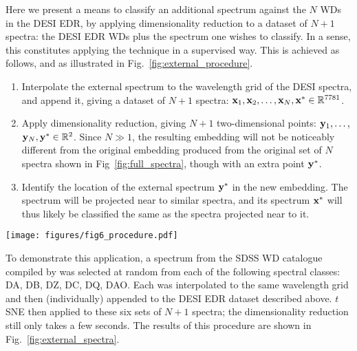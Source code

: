 \documentclass[fleqn,usenatbib]{mnras}
\def\xb{\vb{x}}
\def\yb{\vb{y}}
\begin{document}
Here we present a means to classify an additional spectrum against the $N$ WDs in the DESI EDR, by applying dimensionality reduction to a dataset of $N+1$ spectra: the DESI EDR WDs plus the spectrum one wishes to classify.
In a sense, this constitutes applying the technique in a supervised way.
This is achieved as follows, and as illustrated in Fig.~\ref{fig:external_procedure}.
\begin{enumerate}
\item
Interpolate the external spectrum to the wavelength grid of the DESI spectra, and append it, giving a dataset of $N+1$ spectra: $\xb_1, \xb_2, \dots, \xb_N, \xb^* \in \mathbb{R}^{7781}$.
\item
Apply dimensionality reduction, giving $N+1$ two-dimensional points: $\yb_1, \dots,$ $\yb_N, \yb^* \in \mathbb{R}^2$.
Since $N\gg1$, the resulting embedding will not be noticeably different from the original embedding produced from the original set of $N$ spectra shown in Fig~\ref{fig:full_spectra}, though with an extra point $\yb^*$.
\item
Identify the location of the external spectrum $\yb^*$ in the new embedding.
The spectrum will be projected near to similar spectra, and its spectrum $\xb^*$ will thus likely be classified the same as the spectra projected near to it.
\end{enumerate}

\begin{figure*}
\texttt{[image: figures/fig6\_procedure.pdf]}
\caption{
    Procedure for classifying external WD spectra against DESI EDR (see text).
    One would estimate the classification of this spectrum (black) as a DA.
}
\label{fig:external_procedure}
\end{figure*}

To demonstrate this application, a spectrum from the SDSS WD catalogue compiled by \citet{gentilefusillo19} was selected at random from each of the following spectral classes: DA, DB, DZ, DC, DQ, DAO.
Each was interpolated to the same wavelength grid and then (individually) appended to the DESI EDR dataset described above.
$t$SNE then applied to these six sets of $N+1$ spectra; the dimensionality reduction still only takes a few seconds.
The results of this procedure are shown in Fig.~\ref{fig:external_spectra}.
\end{document}
